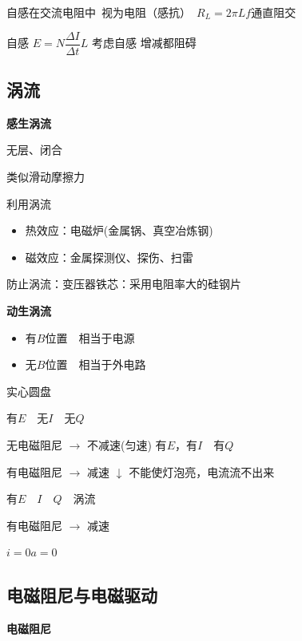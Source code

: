 \noindent 自感在交流电阻中\ 视为电阻（感抗）\ $R_L=2\pi Lf$\quad 通直阻交%

自感 $E=N\dfrac{\Delta I}{\Delta t}L$ %
考虑自感
增减都阻碍

\subsection{涡流}
\textbf{感生涡流}

无层、闭合

类似滑动摩擦力

利用涡流
\begin{itemize}
  \item 热效应：电磁炉(金属锅、真空冶炼钢)
  \item 磁效应：金属探测仪、探伤、扫雷
\end{itemize}
防止涡流：变压器铁芯：采用电阻率大的硅钢片

\textbf{动生涡流}
\begin{itemize}
  \item 有$B$位置　相当于电源
  \item 无$B$位置　相当于外电路
\end{itemize}
实心圆盘

有$E$　无$I$　无$Q$

无电磁阻尼 $\to$ 不减速(匀速)
有$E$，有$I$　有$Q$

有电磁阻尼 $\to$ 减速
$\downarrow$ 不能使灯泡亮，电流流不出来

有$E$　$I$　$Q$　涡流

有电磁阻尼 $\to$ 减速

$i=0$\quad $a=0$ %

\subsection{电磁阻尼与电磁驱动}
\textbf{电磁阻尼}

